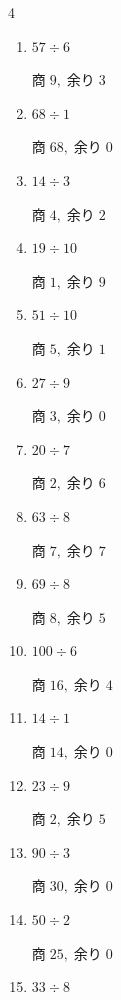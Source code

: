 \begin{multicols}{4}
\begin{enumerate}
        $商\; 12,\; 余り\; 0$

  \item $57 \div 6$

        $商\; 9,\; 余り\; 3$

  \item $68 \div 1$

        $商\; 68,\; 余り\; 0$

  \item $14 \div 3$

        $商\; 4,\; 余り\; 2$

  \item $19 \div 10$

        $商\; 1,\; 余り\; 9$

  \item $51 \div 10$

        $商\; 5,\; 余り\; 1$

  \item $27 \div 9$

        $商\; 3,\; 余り\; 0$

\columnbreak %

  \item $20 \div 7$

        $商\; 2,\; 余り\; 6$

  \item $63 \div 8$

        $商\; 7,\; 余り\; 7$

  \item $69 \div 8$

        $商\; 8,\; 余り\; 5$

  \item $100 \div 6$

        $商\; 16,\; 余り\; 4$

  \item $14 \div 1$

        $商\; 14,\; 余り\; 0$

  \item $23 \div 9$

        $商\; 2,\; 余り\; 5$

  \item $90 \div 3$

        $商\; 30,\; 余り\; 0$

  \item $50 \div 2$

        $商\; 25,\; 余り\; 0$

  \item $33 \div 8$


\end{enumerate}
\end{multicols}
